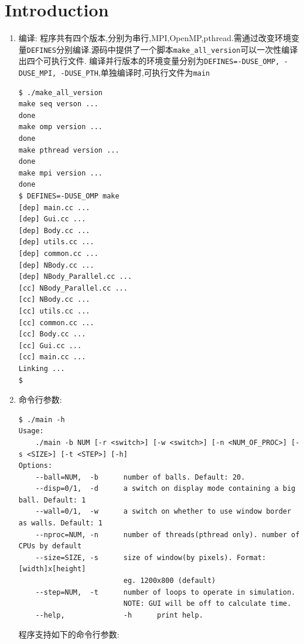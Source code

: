 \section{Introduction}

\begin{enumerate}
	\item 编译:
		程序共有四个版本,分别为串行,MPI,OpenMP,pthread.需通过改变环境变量\verb|DEFINES|分别编译.源码中提供了一个脚本\verb|make_all_version|可以一次性编译出四个可执行文件.
		编译并行版本的环境变量分别为\verb|DEFINES=-DUSE_OMP, -DUSE_MPI, -DUSE_PTH|,单独编译时,可执行文件为\verb|main|
\begin{lstlisting}
$ ./make_all_version
make seq verson ...
done
make omp version ...
done
make pthread version ...
done
make mpi version ...
done
$ DEFINES=-DUSE_OMP make
[dep] main.cc ...
[dep] Gui.cc ...
[dep] Body.cc ...
[dep] utils.cc ...
[dep] common.cc ...
[dep] NBody.cc ...
[dep] NBody_Parallel.cc ...
[cc] NBody_Parallel.cc ...
[cc] NBody.cc ...
[cc] utils.cc ...
[cc] common.cc ...
[cc] Body.cc ...
[cc] Gui.cc ...
[cc] main.cc ...
Linking ...
$
\end{lstlisting}

\item 命令行参数:
	\begin{lstlisting}[basicstyle=\tiny\ttfamily]
$ ./main -h
Usage:
    ./main -b NUM [-r <switch>] [-w <switch>] [-n <NUM_OF_PROC>] [-s <SIZE>] [-t <STEP>] [-h]
Options:
    --ball=NUM,  -b      number of balls. Default: 20.
    --disp=0/1,  -d      a switch on display mode containing a big ball. Default: 1
    --wall=0/1,  -w      a switch on whether to use window border as walls. Default: 1
    --nproc=NUM, -n      number of threads(pthread only). number of CPUs by default
    --size=SIZE, -s      size of window(by pixels). Format: [width]x[height]
                         eg. 1200x800 (default)
    --step=NUM,  -t      number of loops to operate in simulation.
                         NOTE: GUI will be off to calculate time.
    --help,              -h      print help.
\end{lstlisting}
程序支持如下的命令行参数:


\end{enumerate}
